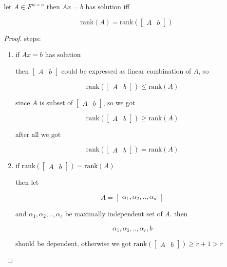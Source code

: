 \begin{exercise}
    let $A \in F^{m \times n}$ then $Ax = b$ has solution iff 

    \[
        \mathrm{rank}(A) = \mathrm{rank}(\begin{bmatrix}
            A & b
        \end{bmatrix})
    \]
\end{exercise}

\begin{proof}
steps:

\begin{enumerate}
    \item if $Ax = b$ has solution

    then $\begin{bmatrix}
        A & b
    \end{bmatrix}$ could be expressed as linear combination of $A$, so

    \[
        \mathrm{rank}(\begin{bmatrix}
        A & b
    \end{bmatrix}) \le \mathrm{rank}(A)
    \]

    since $A$ is subset of  $\begin{bmatrix}
        A & b
    \end{bmatrix}$, so we got

    \[
        \mathrm{rank}(\begin{bmatrix}
        A & b
    \end{bmatrix}) \ge \mathrm{rank}(A)
    \]

    after all we got

    \[
        \mathrm{rank}(\begin{bmatrix}
        A & b
    \end{bmatrix}) = \mathrm{rank}(A)
    \]

    \item if $        \mathrm{rank}(\begin{bmatrix}
        A & b
    \end{bmatrix}) = \mathrm{rank}(A)$


    then let 

    \[
        A = \begin{bmatrix}
            \alpha_1, \alpha_2, .., \alpha_n
        \end{bmatrix}
    \]

    and $\alpha_1, \alpha_2,..,\alpha_r$ be maximally independent set of $A$. then

    \[
        \alpha_1, \alpha_2,..,\alpha_r, b
    \]

    should be dependent, otherwise we got $\mathrm{rank}(\begin{bmatrix}
        A & b
    \end{bmatrix}) \ge r + 1 > r$ 
\end{enumerate}
\end{proof}